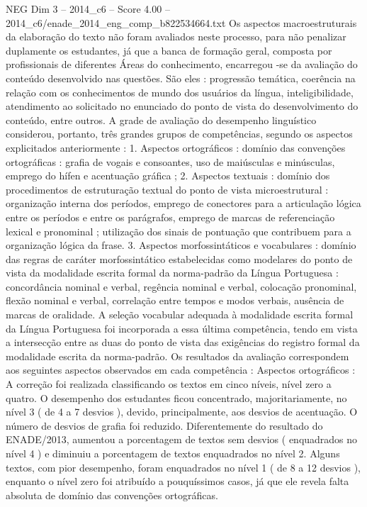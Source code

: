 \begin{textsample}{NEG Dim 3 – 2014\_c6 – Score 4.00 – 2014\_c6/enade\_2014\_eng\_comp\_b822534664.txt}
Os aspectos macroestruturais da elaboração do texto não foram avaliados neste processo, para não penalizar duplamente os estudantes, já que a banca de formação geral, composta por profissionais de diferentes Áreas do conhecimento, encarregou -se da avaliação do conteúdo desenvolvido nas questões.
São eles : progressão temática, coerência na relação com os conhecimentos de mundo dos usuários da língua, inteligibilidade, atendimento ao solicitado no enunciado do ponto de vista do desenvolvimento do conteúdo, entre outros.
A grade de avaliação do desempenho linguístico considerou, portanto, três grandes grupos de competências, segundo os aspectos explicitados anteriormente : 1.
Aspectos ortográficos : domínio das convenções ortográficas : grafia de vogais e consoantes, uso de maiúsculas e minúsculas, emprego do hífen e acentuação gráfica ; 2.
Aspectos textuais : domínio dos procedimentos de estruturação textual do ponto de vista microestrutural : organização interna dos períodos, emprego de conectores para a articulação lógica entre os períodos e entre os parágrafos, emprego de marcas de referenciação lexical e pronominal ; utilização dos sinais de pontuação que contribuem para a organização lógica da frase. 3.
Aspectos morfossintáticos e vocabulares : domínio das regras de caráter morfossintático estabelecidas como modelares do ponto de vista da modalidade escrita formal da norma-padrão da Língua Portuguesa : concordância nominal e verbal, regência nominal e verbal, colocação pronominal, flexão nominal e verbal, correlação entre tempos e modos verbais, ausência de marcas de oralidade.
A seleção vocabular adequada à modalidade escrita formal da Língua Portuguesa foi incorporada a essa última competência, tendo em vista a intersecção entre as duas do ponto de vista das exigências do registro formal da modalidade escrita da norma-padrão.
Os resultados da avaliação correspondem aos seguintes aspectos observados em cada competência : Aspectos ortográficos : A correção foi realizada classificando os textos em cinco níveis, nível zero a quatro.
O desempenho dos estudantes ficou concentrado, majoritariamente, no nível 3 ( de 4 a 7 desvios ), devido, principalmente, aos desvios de acentuação.
O número de desvios de grafia foi reduzido.
Diferentemente do resultado do ENADE/2013, aumentou a porcentagem de textos sem desvios ( enquadrados no nível 4 ) e diminuiu a porcentagem de textos enquadrados no nível 2.
Alguns textos, com pior desempenho, foram enquadrados no nível 1 ( de 8 a 12 desvios ), enquanto o nível zero foi atribuído a pouquíssimos casos, já que ele revela falta absoluta de domínio das convenções ortográficas.

\end{textsample}
